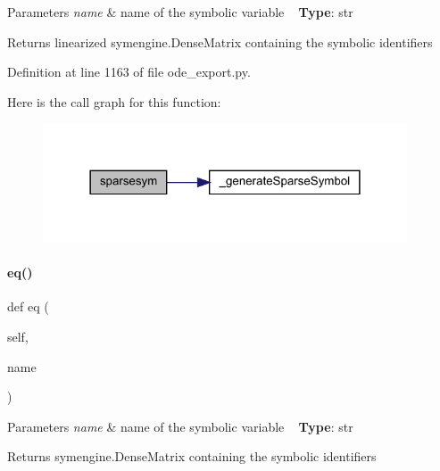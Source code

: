 \begin{DoxyParams}{Parameters}
{\em name} & name of the symbolic variable ~\newline
{\bfseries{Type}}\+: str\\
\hline
\end{DoxyParams}
\begin{DoxyReturn}{Returns}
linearized symengine.\+Dense\+Matrix containing the symbolic identifiers 
\end{DoxyReturn}


Definition at line 1163 of file ode\+\_\+export.\+py.

Here is the call graph for this function\+:
\nopagebreak
\begin{figure}[H]
\begin{center}
\leavevmode
\includegraphics[width=306pt]{classamici_1_1ode__export_1_1_o_d_e_model_a0a1d830b8c4d1e208e81f48dfea71cf4_cgraph}
\end{center}
\end{figure}
\mbox{\label{classamici_1_1ode__export_1_1_o_d_e_model_addafc9d839b53dbe76461d8ac6dba604}} 
\paragraph{\texorpdfstring{eq()}{eq()}}
{\footnotesize\ttfamily def eq (\begin{DoxyParamCaption}\item[{}]{self,  }\item[{}]{name }\end{DoxyParamCaption})}


\begin{DoxyParams}{Parameters}
{\em name} & name of the symbolic variable ~\newline
{\bfseries{Type}}\+: str\\
\hline
\end{DoxyParams}
\begin{DoxyReturn}{Returns}
symengine.\+Dense\+Matrix containing the symbolic identifiers 
\end{DoxyReturn}


